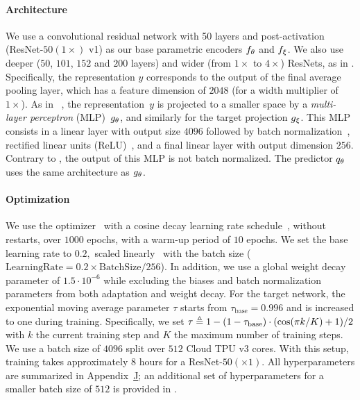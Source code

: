 \paragraph{Architecture} We use a convolutional residual network \cite{ResNet} with 50 layers and post-activation (ResNet-$50(1 \times)$ v1) as our base parametric encoders $f_{\theta}$ and $f_\xi$. We also use deeper ($50$, $101$, $152$ and $200$ layers) and wider (from $1 \times$ to $4 \times$) ResNets, as in \cite{zagoruyko2016wide,kolesnikov2019revisiting,SimCLR}. Specifically, the representation $y$ corresponds to the output of the final average pooling layer, which has a feature dimension of $2048$ (for a width multiplier of $1\times$). As in \simclr~\cite{SimCLR}, the representation~$y$ is projected to a smaller space by a \emph{multi-layer perceptron} (MLP)~$g_{\theta}$, and similarly for the target projection $g_\xi$. This MLP consists in a linear layer with output size $4096$ followed by batch normalization~\cite{BatchNorm}, rectified linear units (ReLU)~\cite{nair2010rectified}, and a final linear layer with output dimension $256$. Contrary to \simclr, the output of this MLP is not batch normalized. The predictor $q_{\theta}$ uses the same architecture as $g_{\theta}$.

\paragraph{Optimization}
We use the \LARS optimizer~\cite{LARS} with a cosine decay learning rate schedule~\cite{SGDR}, without restarts, over $1000$ epochs, with a warm-up period of $10$ epochs. We set the base learning rate to $0.2,$ scaled linearly~\cite{Goyal2017} with the batch size ($\text{LearningRate} = 0.2\times \text{BatchSize} / 256$). In addition, we use a global weight decay parameter of $1.5\cdot10^{-6}$ while excluding the biases and batch normalization parameters from both \LARS adaptation and weight decay. For the target network, the exponential moving average parameter $\tau$ starts from $\tau_\text{base} = 0.996$ and is increased to one during training. Specifically, we set $\tau \triangleq 1 - (1-\tau_\text{base})\cdot \pa{\cos\pa{\pi k / K} + 1} / 2$ with $k$ the current training step and $K$ the maximum number of training steps. We use a batch size of $4096$ split over $512$ Cloud TPU v$3$ cores. With this setup, training takes approximately $8$ hours for a ResNet-$50(\times 1)$. All hyperparameters are summarized in Appendix~\hyperlink{page.33}{J}; 
an additional set of hyperparameters for a smaller batch size of $512$ is provided in .